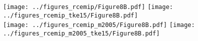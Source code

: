 \documentclass[class=minimal,border=0pt,varwidth]{standalone}
\begin{document}
\texttt{[image: ../figures\_rcemip/Figure8B.pdf]}
\texttt{[image: ../figures\_rcemip\_tke15/Figure8B.pdf]}\\
\texttt{[image: ../figures\_rcemip\_m2005/Figure8B.pdf]}
\texttt{[image: ../figures\_rcemip\_m2005\_tke15/Figure8B.pdf]}
\end{document}
